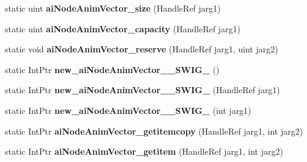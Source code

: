 \begin{DoxyCompactItemize}
\item 
\hypertarget{class_assimp_p_i_n_v_o_k_e_abc00b4439a8850a1a52fc7283fe965f0}{static uint {\bfseries ai\+Node\+Anim\+Vector\+\_\+size} (Handle\+Ref jarg1)}\label{class_assimp_p_i_n_v_o_k_e_abc00b4439a8850a1a52fc7283fe965f0}

\item 
\hypertarget{class_assimp_p_i_n_v_o_k_e_aad4042351b90c03aa0582176f4ea1d73}{static uint {\bfseries ai\+Node\+Anim\+Vector\+\_\+capacity} (Handle\+Ref jarg1)}\label{class_assimp_p_i_n_v_o_k_e_aad4042351b90c03aa0582176f4ea1d73}

\item 
\hypertarget{class_assimp_p_i_n_v_o_k_e_abeb238857cf9d1f2cc0746785cd1e29f}{static void {\bfseries ai\+Node\+Anim\+Vector\+\_\+reserve} (Handle\+Ref jarg1, uint jarg2)}\label{class_assimp_p_i_n_v_o_k_e_abeb238857cf9d1f2cc0746785cd1e29f}

\item 
\hypertarget{class_assimp_p_i_n_v_o_k_e_ac06d6f9e130f0b587bfc08fbaa66b78f}{static Int\+Ptr {\bfseries new\+\_\+ai\+Node\+Anim\+Vector\+\_\+\+\_\+\+S\+W\+I\+G\+\_} ()}\label{class_assimp_p_i_n_v_o_k_e_ac06d6f9e130f0b587bfc08fbaa66b78f}

\item 
\hypertarget{class_assimp_p_i_n_v_o_k_e_a3480844346c44a46b169dd5192bd947a}{static Int\+Ptr {\bfseries new\+\_\+ai\+Node\+Anim\+Vector\+\_\+\+\_\+\+S\+W\+I\+G\+\_} (Handle\+Ref jarg1)}\label{class_assimp_p_i_n_v_o_k_e_a3480844346c44a46b169dd5192bd947a}

\item 
\hypertarget{class_assimp_p_i_n_v_o_k_e_a6ef1db56ea053f6bca6215d6ce4daa7c}{static Int\+Ptr {\bfseries new\+\_\+ai\+Node\+Anim\+Vector\+\_\+\+\_\+\+S\+W\+I\+G\+\_} (int jarg1)}\label{class_assimp_p_i_n_v_o_k_e_a6ef1db56ea053f6bca6215d6ce4daa7c}

\item 
\hypertarget{class_assimp_p_i_n_v_o_k_e_a0a57ff9e214ee60b782a766981003432}{static Int\+Ptr {\bfseries ai\+Node\+Anim\+Vector\+\_\+getitemcopy} (Handle\+Ref jarg1, int jarg2)}\label{class_assimp_p_i_n_v_o_k_e_a0a57ff9e214ee60b782a766981003432}

\item 
\hypertarget{class_assimp_p_i_n_v_o_k_e_af9ad49563d509c04da414971bb7a3a6e}{static Int\+Ptr {\bfseries ai\+Node\+Anim\+Vector\+\_\+getitem} (Handle\+Ref jarg1, int jarg2)}\label{class_assimp_p_i_n_v_o_k_e_af9ad49563d509c04da414971bb7a3a6e}


\end{DoxyCompactItemize}

